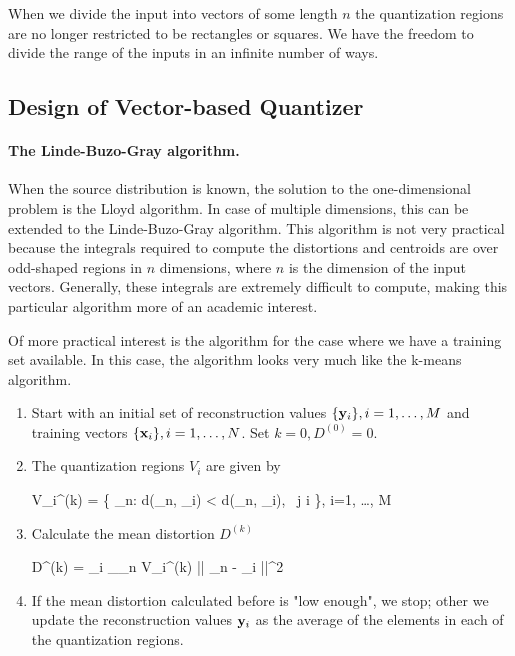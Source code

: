 When we divide the input into vectors of some length $n$ the quantization regions are no longer restricted to be rectangles or squares. We have the freedom to divide the range of the inputs in an infinite number of ways.

\subsection{Design of Vector-based Quantizer}

\paragraph{The Linde-Buzo-Gray algorithm.} When the source distribution is known, the solution to the one-dimensional problem is the Lloyd algorithm. In case of multiple dimensions, this can be extended to the Linde-Buzo-Gray algorithm. This algorithm is not very practical because the integrals required to compute the distortions and centroids are over odd-shaped regions in $n$ dimensions, where $n$ is the dimension of the input vectors. Generally, these integrals are extremely difficult to compute, making this particular algorithm more of an academic interest.

Of more practical interest is the algorithm for the case where we have a training set available. In this case, the algorithm looks very much like the k-means algorithm.

\begin{enumerate}
    \item Start with an initial set of reconstruction values $\{ \mathbf{y}_i \}, i=1,\ldots, M$ and training vectors $\{ \mathbf{x}_i \}, i=1,\ldots, N$. Set $k=0, D^{(0)} = 0$.
    \item The quantization regions $V_i$ are given by
    
    \bee
        V_i^{(k)} = \{ \xbf_n: d(\xbf_n, \ybf_i) < d(\xbf_n, \ybf_i), \, \forall j \neq i \}, \quad i=1, \ldots, M
    \eee

    \item Calculate the mean distortion $D^{(k)}$
    
    \bee
        D^{(k)} =  \sum_i \sum_{\xbf_n \in V_i^{(k)}} || \xbf_n - \ybf_i ||^2
    \eee

    \item If the mean distortion calculated before is "low enough", we stop; other we update the reconstruction values $\mathbf{y}_i$ as the average of the elements in each of the quantization regions.

\end{enumerate}


